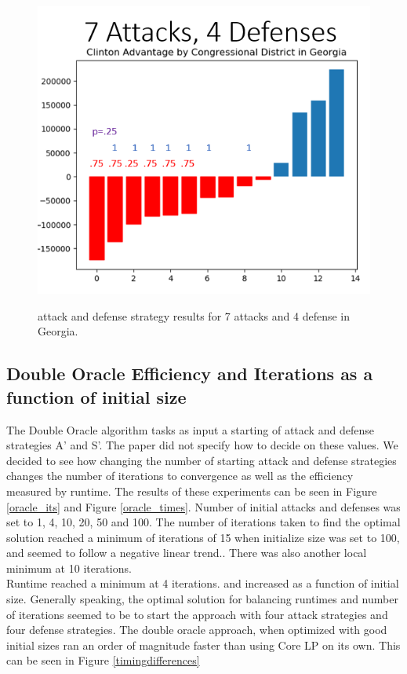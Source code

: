 \documentclass[letterpaper]{article} %
\begin{document}
\begin{figure}
    \includegraphics[width=\linewidth]{7and4}
    \label{7and4}
 \caption{attack and defense strategy results for 7 attacks and 4 defense in Georgia.}
\end{figure}


\subsection{Double Oracle Efficiency and Iterations as a function of initial size}

The Double Oracle algorithm tasks as input a starting of attack and defense strategies A' and S'. The paper did not specify how to decide on these values. We decided to see how changing the number of starting attack and defense strategies changes the number of iterations to convergence as well as the efficiency measured by runtime. The results of these experiments can be seen in Figure \ref{oracle_its} and Figure \ref{oracle_times}. Number of initial attacks and defenses was set to 1, 4, 10, 20, 50 and 100. The number of iterations taken to find the optimal solution reached a minimum of iterations of 15 when initialize size was set to 100, and seemed to follow a negative linear trend.. There was also another local minimum at 10 iterations.  \\
Runtime reached a minimum at 4 iterations. and increased as a function of initial size. Generally speaking, the optimal solution for balancing runtimes and number of iterations seemed to be to start the approach with four attack strategies and four defense strategies. The double oracle approach, when optimized with good initial sizes ran an order of magnitude faster than using Core LP on its own. This can be seen in Figure \ref{timingdifferences}
\end{document}
